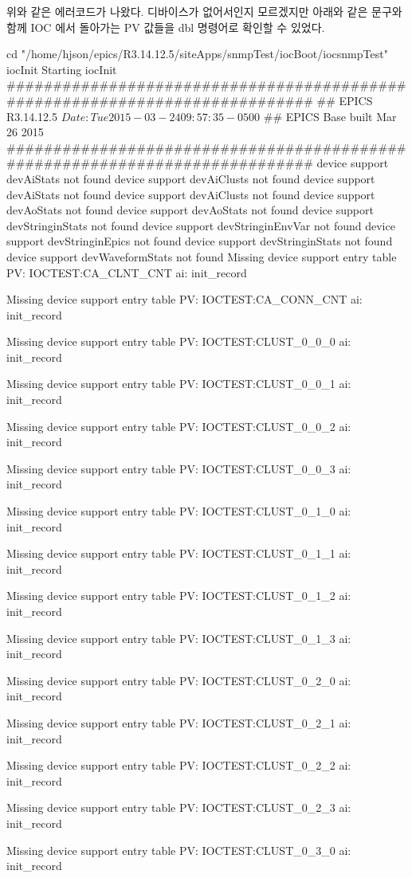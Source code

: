 위와 같은 에러코드가 나왔다. 디바이스가 없어서인지 모르겠지만 아래와 같은 문구와 함께
IOC 에서 돌아가는 PV 값들을 dbl 명령어로 확인할 수 있었다.

cd "/home/hjson/epics/R3.14.12.5/siteApps/snmpTest/iocBoot/iocsnmpTest"
iocInit
Starting iocInit
############################################################################
## EPICS R3.14.12.5 $Date: Tue 2015-03-24 09:57:35 -0500$
## EPICS Base built Mar 26 2015
############################################################################
device support devAiStats not found
device support devAiClusts not found
device support devAiStats not found
device support devAiClusts not found
device support devAoStats not found
device support devAoStats not found
device support devStringinStats not found
device support devStringinEnvVar not found
device support devStringinEpics not found
device support devStringinStats not found
device support devWaveformStats not found
Missing device support entry table PV: IOCTEST:CA_CLNT_CNT ai: init_record

Missing device support entry table PV: IOCTEST:CA_CONN_CNT ai: init_record

Missing device support entry table PV: IOCTEST:CLUST_0_0_0 ai: init_record

Missing device support entry table PV: IOCTEST:CLUST_0_0_1 ai: init_record

Missing device support entry table PV: IOCTEST:CLUST_0_0_2 ai: init_record

Missing device support entry table PV: IOCTEST:CLUST_0_0_3 ai: init_record

Missing device support entry table PV: IOCTEST:CLUST_0_1_0 ai: init_record

Missing device support entry table PV: IOCTEST:CLUST_0_1_1 ai: init_record

Missing device support entry table PV: IOCTEST:CLUST_0_1_2 ai: init_record

Missing device support entry table PV: IOCTEST:CLUST_0_1_3 ai: init_record

Missing device support entry table PV: IOCTEST:CLUST_0_2_0 ai: init_record

Missing device support entry table PV: IOCTEST:CLUST_0_2_1 ai: init_record

Missing device support entry table PV: IOCTEST:CLUST_0_2_2 ai: init_record

Missing device support entry table PV: IOCTEST:CLUST_0_2_3 ai: init_record

Missing device support entry table PV: IOCTEST:CLUST_0_3_0 ai: init_record

